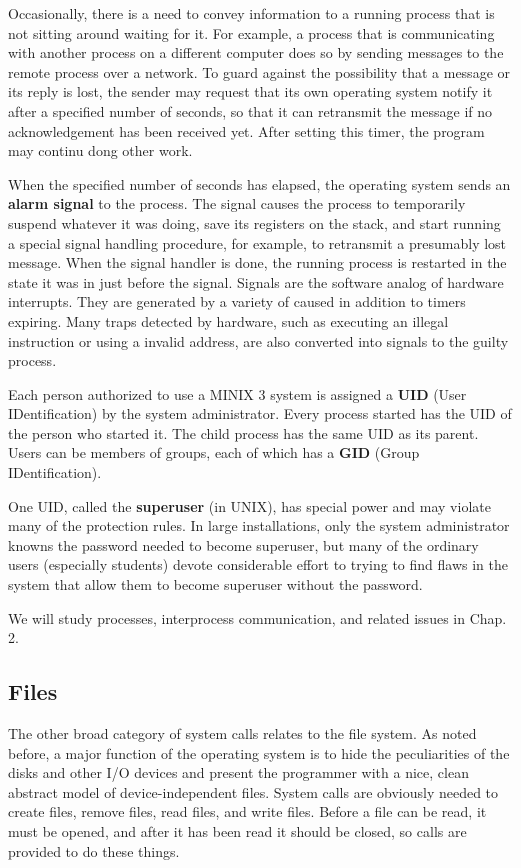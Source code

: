 \documentclass{book}
\newcommand {\kw}  [1] {\textbf{#1}}
\begin{document}
Occasionally, there is a need to convey information to a running process that is not sitting around waiting for it.
For example, a process that is communicating with another process on a different computer does so 
by sending messages to the remote process over a network.
To guard against the possibility that a message or its reply is lost, the sender may request that its own operating system notify it 
after a specified number of seconds, so that it can retransmit the message if no acknowledgement has been received yet.
After setting this timer, the program may continu dong other work.

When the specified number of seconds has elapsed, the operating system sends an \kw{alarm signal} to the process.
The signal causes the process to temporarily suspend whatever it was doing, save its registers on the stack, 
and start running a special signal handling procedure, for example, to retransmit a presumably lost message.
When the signal handler is done, the running process is restarted in the state it was in just before the signal.
Signals are the software analog of hardware interrupts.
They are generated by a variety of caused in addition to timers expiring.
Many traps detected by hardware, such as executing an illegal instruction or using a invalid address, 
are also converted into signals to the guilty process.

Each person authorized to use a MINIX 3 system is assigned a \kw{UID} (User IDentification) by the system administrator.
Every process started has the UID of the person who started it.
The child process has the same UID as its parent.
Users can be members of groups, each of which has a \kw{GID} (Group IDentification).

One UID, called the \kw{superuser} (in UNIX), has special power and may violate many of the protection rules.
In large installations, only the system administrator knowns the password needed to become superuser, 
but many of the ordinary users (especially students) devote considerable effort to trying to find flaws in the system 
that allow them to become superuser without the password.

We will study processes, interprocess communication, and related issues in Chap. 2.

\subsection{Files}
The other broad category of system calls relates to the file system.
As noted before, a major function of the operating system is to hide the peculiarities of the disks and other I/O devices 
and present the programmer with a nice, clean abstract model of device-independent files.
System calls are obviously needed to create files, remove files, read files, and write files.
Before a file can be read, it must be opened, and after it has been read it should be closed, so calls are provided to do these things.
\end{document}
